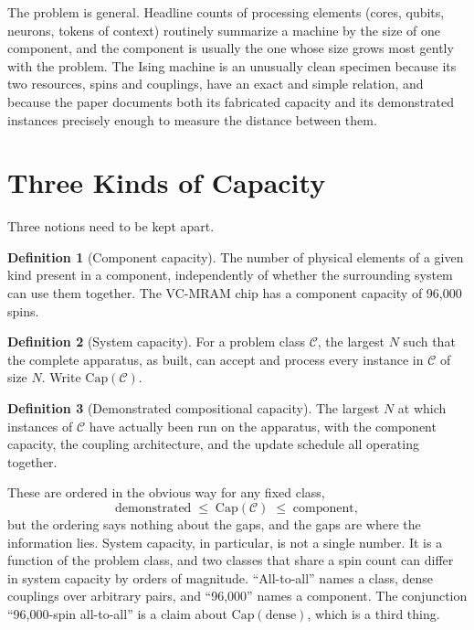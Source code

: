 \documentclass[11pt]{article}
\theoremstyle{definition}
\newtheorem{definition}{Definition}
\theoremstyle{remark}
\begin{document}
The problem is general. Headline counts of processing elements (cores, qubits, neurons, tokens of context) routinely summarize a machine by the size of one component, and the component is usually the one whose size grows most gently with the problem. The Ising machine is an unusually clean specimen because its two resources, spins and couplings, have an exact and simple relation, and because the paper documents both its fabricated capacity and its demonstrated instances precisely enough to measure the distance between them.

\section{Three Kinds of Capacity}

Three notions need to be kept apart.

\begin{definition}[Component capacity]
The number of physical elements of a given kind present in a component, independently of whether the surrounding system can use them together. The VC-MRAM chip has a component capacity of 96,000 spins.
\end{definition}

\begin{definition}[System capacity]
For a problem class $\mathcal{C}$, the largest $N$ such that the complete apparatus, as built, can accept and process every instance in $\mathcal{C}$ of size $N$. Write $\mathrm{Cap}(\mathcal{C})$.
\end{definition}

\begin{definition}[Demonstrated compositional capacity]
The largest $N$ at which instances of $\mathcal{C}$ have actually been run on the apparatus, with the component capacity, the coupling architecture, and the update schedule all operating together.
\end{definition}

These are ordered in the obvious way for any fixed class,
\begin{equation}
\text{demonstrated} \;\leq\; \mathrm{Cap}(\mathcal{C}) \;\leq\; \text{component},
\end{equation}
but the ordering says nothing about the gaps, and the gaps are where the information lies. System capacity, in particular, is not a single number. It is a function of the problem class, and two classes that share a spin count can differ in system capacity by orders of magnitude. ``All-to-all'' names a class, dense couplings over arbitrary pairs, and ``96,000'' names a component. The conjunction ``96,000-spin all-to-all'' is a claim about $\mathrm{Cap}(\text{dense})$, which is a third thing.
\end{document}
